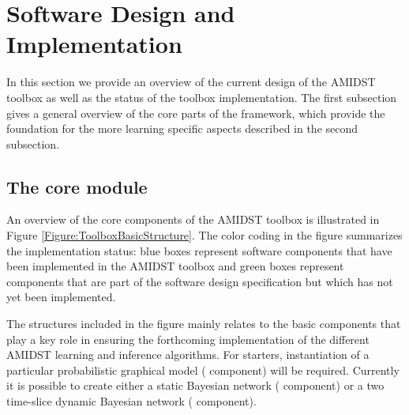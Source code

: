 \section{Software Design and Implementation}\label{sec:design}

In this section we provide an overview of the current design of the AMIDST toolbox as well as the status of the
toolbox implementation. The first subsection gives a general overview of the core parts of the framework,
which provide the foundation for the more learning specific aspects described in the second subsection.    

\subsection{The core module}
\label{sec:core-module}

An overview of the core components of the AMIDST toolbox is illustrated in Figure
\ref{Figure:ToolboxBasicStructure}. The color coding in the figure summarizes the implementation status: blue boxes represent
software components that have been implemented in the AMIDST toolbox and green boxes represent components
that are part of the software design specification but which has not yet been implemented.      

The structures included in the figure
mainly relates to the basic components that play a key role in ensuring the
forthcoming implementation of the different AMIDST learning and inference algorithms. For starters, instantiation of a particular probabilistic graphical model ( component) will be required. Currently it is possible to create either a static Bayesian network ( component) or a two time-slice dynamic Bayesian network ( component).

